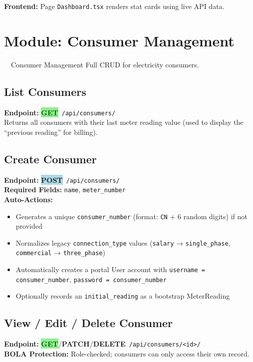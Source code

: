 \documentclass[12pt, a4paper]{report}
\newcommand{\httpget}{\colorbox{lightGreen}{\textcolor{darkGreen}{\textbf{\small GET}}}}
\newcommand{\httppost}{\colorbox{lightBlue}{\textcolor{deepBlue}{\textbf{\small POST}}}}
\newcommand{\httppatch}{\colorbox{warningBg}{\textcolor{accentAmber}{\textbf{\small PATCH}}}}
\newcommand{\httpdelete}{\colorbox{red!10}{\textcolor{dangerRed}{\textbf{\small DELETE}}}}
\newenvironment{featurelist}{%
    \begin{itemize}[leftmargin=1.5em, itemsep=2pt, parsep=0pt]
}{%
    \end{itemize}
}
\begin{document}
\textbf{Frontend:} Page \texttt{Dashboard.tsx} renders stat cards using live API data.

\section{Module: Consumer Management}

\begin{modulebox}{\faUsers\ \ Consumer Management}
Full CRUD for electricity consumers.
\end{modulebox}

\subsection{List Consumers}
\textbf{Endpoint:} \httpget\ \texttt{/api/consumers/}\\
Returns all consumers with their last meter reading value (used to display the ``previous reading'' for billing).

\subsection{Create Consumer}
\textbf{Endpoint:} \httppost\ \texttt{/api/consumers/}\\
\textbf{Required Fields:} \texttt{name}, \texttt{meter\_number}\\
\textbf{Auto-Actions:}
\begin{featurelist}
    \item Generates a unique \texttt{consumer\_number} (format: \texttt{CN} + 6 random digits) if not provided
    \item Normalizes legacy \texttt{connection\_type} values (\texttt{salary} → \texttt{single\_phase}, \texttt{commercial} → \texttt{three\_phase})
    \item Automatically creates a portal User account with \texttt{username = consumer\_number}, \texttt{password = consumer\_number}
    \item Optionally records an \texttt{initial\_reading} as a bootstrap MeterReading
\end{featurelist}

\subsection{View / Edit / Delete Consumer}
\textbf{Endpoint:} \httpget/\httppatch/\httpdelete\ \texttt{/api/consumers/<id>/}\\
\textbf{BOLA Protection:} Role-checked; consumers can only access their own record.
\end{document}
